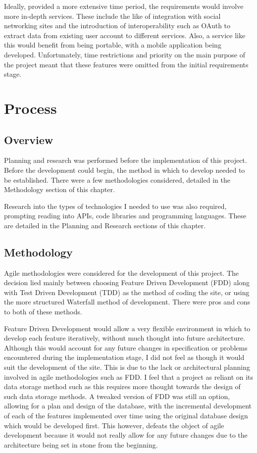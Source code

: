 Ideally, provided a more extensive time period, the requirements would involve more in-depth services. These include the like of integration with social networking sites and the introduction of interoperability such as OAuth\cite{outh} to extract data from existing user account to different services. Also, a service like this would benefit from being portable, with a mobile application being developed. Unfortunately, time restrictions and priority on the main purpose of the project meant that these features were omitted from the initial requirements stage.

\section{Process}
\subsection{Overview}
Planning and research was performed before the implementation of this project. Before the development could begin, the method in which to develop needed to be established. There were a few methodologies considered, detailed in the Methodology section of this chapter.

Research into the types of technologies I needed to use was also required, prompting reading into APIs, code libraries and programming languages. These are detailed in the Planning and Research sections of this chapter.

\subsection{Methodology}
Agile methodologies were considered for the development of this project. The decision lied mainly between choosing Feature Driven Development (FDD) along with Test Driven Development (TDD) as the method of coding the site, or using the more structured Waterfall method of development. There were pros and cons to both of these methods. 

Feature Driven Development would allow a very flexible environment in which to develop each feature iteratively, without much thought into future architecture. Although this would account for any future changes in specification or problems encountered during the implementation stage, I did not feel as though it would suit the development of the site. This is due to the lack or architectural planning involved in agile methodologies such as FDD. I feel that a project as reliant on its data storage method such as this requires more thought towards the design of such data storage methods. A tweaked version of FDD was still an option, allowing for a plan and design of the database, with the incremental development of each of the features implemented over time using the original database design which would be developed first. This however, defeats the object of agile development because it would not really allow for any future changes due to the architecture being set in stone from the beginning.

